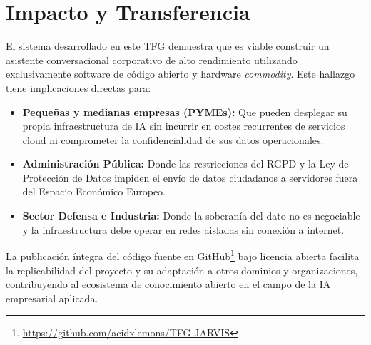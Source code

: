 \section{Impacto y Transferencia}

El sistema desarrollado en este TFG demuestra que es viable construir un asistente conversacional corporativo de alto rendimiento utilizando exclusivamente software de código abierto y hardware \textit{commodity}. Este hallazgo tiene implicaciones directas para:

\begin{itemize}
    \item \textbf{Pequeñas y medianas empresas (PYMEs):} Que pueden desplegar su propia infraestructura de IA sin incurrir en costes recurrentes de servicios cloud ni comprometer la confidencialidad de sus datos operacionales.
    \item \textbf{Administración Pública:} Donde las restricciones del RGPD y la Ley de Protección de Datos impiden el envío de datos ciudadanos a servidores fuera del Espacio Económico Europeo.
    \item \textbf{Sector Defensa e Industria:} Donde la soberanía del dato no es negociable y la infraestructura debe operar en redes aisladas sin conexión a internet.
\end{itemize}

La publicación íntegra del código fuente en GitHub\footnote{\url{https://github.com/acidxlemons/TFG-JARVIS}} bajo licencia abierta facilita la replicabilidad del proyecto y su adaptación a otros dominios y organizaciones, contribuyendo al ecosistema de conocimiento abierto en el campo de la IA empresarial aplicada.

